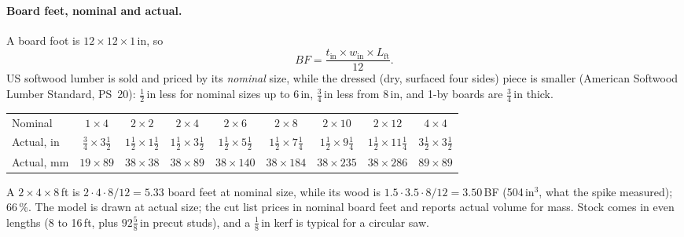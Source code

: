 \paragraph{Board feet, nominal and actual.} A board foot is $12\times12\times1$\,in, so
\[
  \mathit{BF} = \frac{t_{\text{in}} \times w_{\text{in}} \times L_{\text{ft}}}{12}.
\]
US softwood lumber is sold and priced by its \emph{nominal} size, while the dressed (dry, surfaced four sides) piece is
smaller (American Softwood Lumber Standard, PS~20): $\tfrac12$\,in less for nominal sizes up to 6\,in, $\tfrac34$\,in
less from 8\,in, and 1-by boards are $\tfrac34$\,in thick.
\begin{center}
\footnotesize\setlength{\tabcolsep}{4pt}
\begin{tabular}{@{}lcccccccc@{}}
\toprule
Nominal & $1\times4$ & $2\times2$ & $2\times4$ & $2\times6$ & $2\times8$ & $2\times10$ & $2\times12$ & $4\times4$\\
Actual, in & $\tfrac34\times3\tfrac12$ & $1\tfrac12\times1\tfrac12$ & $1\tfrac12\times3\tfrac12$ & $1\tfrac12\times5\tfrac12$ & $1\tfrac12\times7\tfrac14$ & $1\tfrac12\times9\tfrac14$ & $1\tfrac12\times11\tfrac14$ & $3\tfrac12\times3\tfrac12$\\
Actual, mm & $19\times89$ & $38\times38$ & $38\times89$ & $38\times140$ & $38\times184$ & $38\times235$ & $38\times286$ & $89\times89$\\
\bottomrule
\end{tabular}
\end{center}
A $2\times4\times8$\,ft is $2\cdot4\cdot8/12 = 5.33$ board feet at nominal size, while its wood is
$1.5\cdot3.5\cdot8/12 = 3.50$\,BF (504\,in$^3$, what the spike measured); 66\,\%. The model is drawn at actual size;
the cut list prices in nominal board feet and reports actual volume for mass. Stock comes in even lengths (8 to 16\,ft,
plus $92\tfrac58$\,in precut studs), and a $\tfrac18$\,in kerf is typical for a circular saw.

